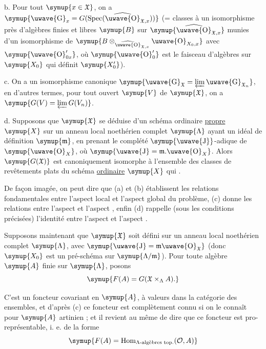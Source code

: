 \noindent b. Pour tout $\symup{x\in\mathfrak X}$, on a $\symup{\text{\uwave{G}}_x=G(\operatorname{Spec}(\widehat{\text{\uwave{O}}}_{\mathfrak X,x}))}$ (= classes à un isomorphisme près d'algèbres finies et libres $\symup{B}$ sur
$\symup{\widehat{\text{\uwave{O}}}_{\mathfrak X,x}}$ munies d'un isomorphisme de
$\symup{B\otimes_{\widehat{\text{\uwave{O}}}_{\mathfrak X,x}}\text{\uwave{O}}_{X_0,x}}$ avec
$\symup{\text{\uwave{O}}'_{0x}}$, où $\symup{\text{\uwave{O}}'_0}$ est le faisceau d'algèbres sur
$\symup{X_0}$ qui définit $\symup{X'_0}$).

\noindent c. On a un isomorphisme canonique $\symup{\text{\uwave{G}}_{\mathfrak X}=\varprojlim \text{\uwave{G}}_{\mathfrak X_n}}$, en d'autres termes, pour tout ouvert $\symup{V}$ de $\symup{\mathfrak X}$, on a $\symup{G(V)=\varprojlim G(V_n)}$.

\noindent d. Supposons que $\symup{\mathfrak X}$ se déduise d'un schéma ordinaire
\uline{propre} $\symup{X}$ sur un anneau local noethérien complet $\symup{\Lambda}$ ayant un idéal de
définition $\symup{\mathfrak m}$, en prenant le complété $\symup{\text{\uwave{J}}}$-adique de
$\symup{\text{\uwave{O}}_X}$, où $\symup{\text{\uwave{J}}=\mathfrak m.\text{\uwave{O}}_X}$. Alors
$\symup{G(\mathfrak X)}$ est canoniquement isomorphe à l'ensemble des classes de
revêtements plats du schéma \uline{ordinaire} $\symup{X}$ qui .

De façon imagée, on peut dire que (a) et (b) établissent les relations
fondamentales entre l'aspect local et l'aspect global du problème, (c) donne
les relations entre l'aspect  et l'aspect , enfin (d)
rappelle (sous les conditions précisées) l'identité entre l'aspect 
et l'aspect .

Supposons maintenant que $\symup{\mathfrak X}$ soit défini sur un anneau local
noethérien complet $\symup{\Lambda}$, avec
$\symup{\text{\uwave{J}}=\mathfrak m\text{\uwave{O}}_{\mathfrak X}}$ (donc $\symup{X_0}$ est un
pré-schéma sur $\symup{\Lambda/\mathfrak m}$). Pour toute algèbre $\symup{A}$ finie sur
$\symup{\Lambda}$, posons
\[
  \symup{F(A)=G(\mathfrak X\times_\Lambda A).}
\]

C'est un foncteur covariant en $\symup{A}$, à valeurs dans la catégorie des ensembles,
et d'après (c) ce foncteur est complètement connu si on le connaît pour $\symup{A}$
artinien ; et il revient au même de dire que ce foncteur est pro-représentable,
i. e. de la forme
\[
  \symup{F(A)=\operatorname{Hom}_{\Lambda\text{-algèbres top.}}(\mathcal O,A)}
\]

